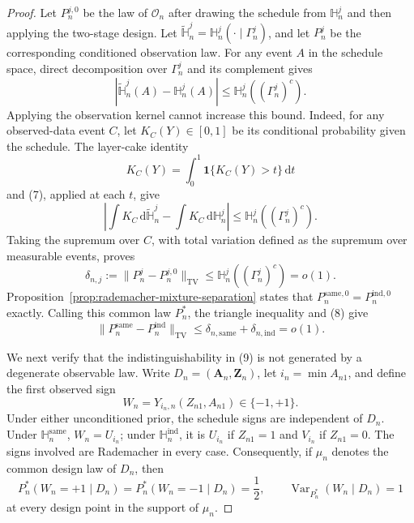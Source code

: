 \documentclass{article}
\begin{document}
\begin{proof}
Let \(P_n^{j,0}\) be the law of \(\mathcal O_n\) after drawing the schedule from \(\mathbb H_n^j\) and then applying the two-stage design. Let \(\widetilde{\mathbb H}_n^j=\mathbb H_n^j(\mathord\cdot\mid\Gamma_n^j)\), and let \(P_n^j\) be the corresponding conditioned observation law. For any event \(A\) in the schedule space, direct decomposition over \(\Gamma_n^j\) and its complement gives
\[
\left|\widetilde{\mathbb H}_n^j(A)-\mathbb H_n^j(A)\right|
\le \mathbb H_n^j((\Gamma_n^j)^c).
\tag{7}
\]
Applying the observation kernel cannot increase this bound. Indeed, for any observed-data event \(C\), let \(K_C(Y)\in[0,1]\) be its conditional probability given the schedule. The layer-cake identity
\[
K_C(Y)=\int_0^1\mathbf 1\{K_C(Y)>t\}\,\mathrm dt
\]
and (7), applied at each \(t\), give
\[
\left|\int K_C\,\mathrm d\widetilde{\mathbb H}_n^j
-\int K_C\,\mathrm d\mathbb H_n^j\right|
\le\mathbb H_n^j((\Gamma_n^j)^c).
\]
Taking the supremum over \(C\), with total variation defined as the supremum over measurable events, proves
\[
\delta_{n,j}:=\lVert P_n^j-P_n^{j,0}\rVert_{\mathrm{TV}}
\le \mathbb H_n^j((\Gamma_n^j)^c)=o(1).
\tag{8}
\]
Proposition~\ref{prop:rademacher-mixture-separation} states that \(P_n^{\mathrm{same},0}=P_n^{\mathrm{ind},0}\) exactly. Calling this common law \(P_n^*\), the triangle inequality and (8) give
\[
\lVert P_n^{\mathrm{same}}-P_n^{\mathrm{ind}}\rVert_{\mathrm{TV}}
\le\delta_{n,\mathrm{same}}+\delta_{n,\mathrm{ind}}=o(1).
\tag{9}
\]

We next verify that the indistinguishability in (9) is not generated by a degenerate observable law. Write \(D_n=(\mathbf A_n,\mathbf Z_n)\), let \(i_n=\min A_{n1}\), and define the first observed sign
\[
W_n=Y_{i_n,n}(Z_{n1},A_{n1})\in\{-1,+1\}.
\tag{10}
\]
Under either unconditioned prior, the schedule signs are independent of \(D_n\). Under \(\mathbb H_n^{\mathrm{same}}\), \(W_n=U_{i_n}\); under \(\mathbb H_n^{\mathrm{ind}}\), it is \(U_{i_n}\) if \(Z_{n1}=1\) and \(V_{i_n}\) if \(Z_{n1}=0\). The signs involved are Rademacher in every case. Consequently, if \(\mu_n\) denotes the common design law of \(D_n\), then
\[
P_n^*(W_n=+1\mid D_n)=P_n^*(W_n=-1\mid D_n)=\frac12,
\qquad
\operatorname{Var}_{P_n^*}(W_n\mid D_n)=1
\tag{11}
\]
at every design point in the support of \(\mu_n\).


\end{proof}
\end{document}
